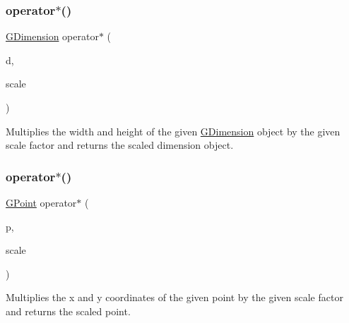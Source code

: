 \mbox{\label{namespacesgl_a84a7c3c5763523efef91d5b6398c730c}} 
\subsubsection{\texorpdfstring{operator$\ast$()}{operator*()}\hspace{0.1cm}{\footnotesize\ttfamily [1/2]}}
{\footnotesize\ttfamily \mbox{\hyperlink{structsgl_1_1GDimension}{G\+Dimension}} operator$\ast$ (\begin{DoxyParamCaption}\item[{const \mbox{\hyperlink{structsgl_1_1GDimension}{G\+Dimension}} \&}]{d,  }\item[{double}]{scale }\end{DoxyParamCaption})}



Multiplies the width and height of the given \mbox{\hyperlink{structsgl_1_1GDimension}{G\+Dimension}} object by the given scale factor and returns the scaled dimension object. 

\mbox{\label{namespacesgl_a8646a3383f5abfedad724d1e5e6040ef}} 
\subsubsection{\texorpdfstring{operator$\ast$()}{operator*()}\hspace{0.1cm}{\footnotesize\ttfamily [2/2]}}
{\footnotesize\ttfamily \mbox{\hyperlink{structsgl_1_1GPoint}{G\+Point}} operator$\ast$ (\begin{DoxyParamCaption}\item[{const \mbox{\hyperlink{structsgl_1_1GPoint}{G\+Point}} \&}]{p,  }\item[{double}]{scale }\end{DoxyParamCaption})}



Multiplies the x and y coordinates of the given point by the given scale factor and returns the scaled point. 

\mbox{\label{namespacesgl_abcbb6e3b6e238b5155c96d6340bf5f43}} 
